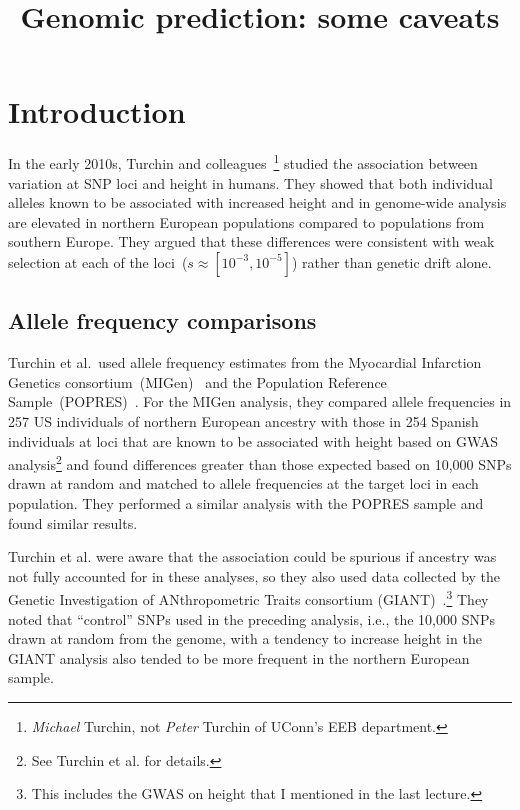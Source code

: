 \documentclass[12pt]{article}
\title{Genomic prediction: some caveats}\index{genomic prediction!caveats}
\begin{document}
\maketitle

\thispagestyle{first}

\section*{Introduction}

In the early 2010s, Turchin and
colleagues~\cite{Turchin-etal-2012}\footnote{{\it Michael\/} Turchin,
  not {\it Peter\/} Turchin of UConn's EEB department.} studied the
association between variation at SNP loci and height in humans. They
showed that both individual alleles known to be associated with
increased height and in genome-wide analysis are elevated in northern
European populations compared to populations from southern
Europe. They argued that these differences were consistent with weak
selection at each of the loci~($s \approx [10^{-3}, 10^{-5}]$) rather
than genetic drift alone.

\subsection*{Allele frequency comparisons}

Turchin et al.\ used allele frequency estimates from the Myocardial
Infarction Genetics consortium~(MIGen)~\cite{MIGen-2009} and the
Population Reference Sample~(POPRES)~\cite{Nelson-etal-2008}. For the MIGen
analysis, they compared allele frequencies in 257 US individuals of
northern European ancestry with those in 254 Spanish individuals at
loci that are known to be associated with height based on GWAS
analysis\footnote{See Turchin et al. for details.} and found
differences greater than those expected based on 10,000 SNPs drawn at
random and matched to allele frequencies at the target loci in each
population. They performed a similar analysis with the POPRES sample
and found similar results.

Turchin et al. were aware that the association could be spurious if
ancestry was not fully accounted for in these analyses, so they also
used data collected by the Genetic Investigation of ANthropometric
Traits consortium (GIANT)~\cite{LangoAllen-etal-2010}.\footnote{This
  includes the GWAS on height that I mentioned in the last lecture.}
They noted that ``control'' SNPs used in the preceding analysis,
i.e., the 10,000 SNPs drawn at random from the genome, with a tendency
to increase height in the GIANT analysis also tended to be more
frequent in the northern European sample.
\end{document}
